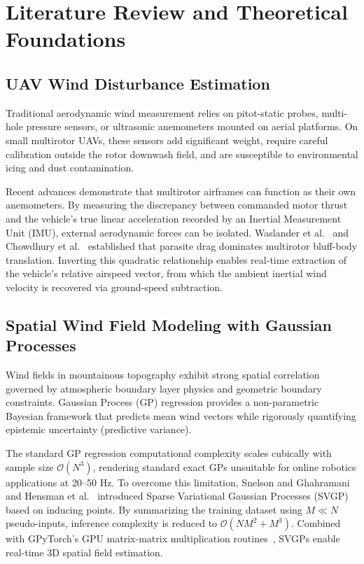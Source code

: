 \documentclass[12pt,a4paper,oneside]{report}
\begin{document}
\chapter{Literature Review and Theoretical Foundations}

\section{UAV Wind Disturbance Estimation}
Traditional aerodynamic wind measurement relies on pitot-static probes, multi-hole pressure sensors, or ultrasonic anemometers mounted on aerial platforms. On small multirotor UAVs, these sensors add significant weight, require careful calibration outside the rotor downwash field, and are susceptible to environmental icing and dust contamination.

Recent advances demonstrate that multirotor airframes can function as their own anemometers. By measuring the discrepancy between commanded motor thrust and the vehicle's true linear acceleration recorded by an Inertial Measurement Unit (IMU), external aerodynamic forces can be isolated. Waslander et al.~\cite{waslander2009} and Chowdhury et al.~\cite{chowdhury2019} established that parasite drag dominates multirotor bluff-body translation. Inverting this quadratic relationship enables real-time extraction of the vehicle's relative airspeed vector, from which the ambient inertial wind velocity is recovered via ground-speed subtraction.

\section{Spatial Wind Field Modeling with Gaussian Processes}
Wind fields in mountainous topography exhibit strong spatial correlation governed by atmospheric boundary layer physics and geometric boundary constraints. Gaussian Process (GP) regression provides a non-parametric Bayesian framework that predicts mean wind vectors while rigorously quantifying epistemic uncertainty (predictive variance).

The standard GP regression computational complexity scales cubically with sample size $\mathcal{O}(N^3)$, rendering standard exact GPs unsuitable for online robotics applications at 20--50 Hz. To overcome this limitation, Snelson and Ghahramani~\cite{snelson2006} and Hensman et al.~\cite{hensman2013} introduced Sparse Variational Gaussian Processes (SVGP) based on inducing points. By summarizing the training dataset using $M \ll N$ pseudo-inputs, inference complexity is reduced to $\mathcal{O}(N M^2 + M^3)$. Combined with GPyTorch's GPU matrix-matrix multiplication routines~\cite{gardner2018}, SVGPs enable real-time 3D spatial field estimation.
\end{document}

